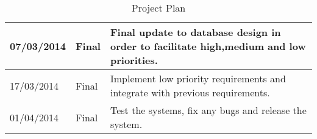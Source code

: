 \documentclass[a4paper,oneside,11pt]{report}
\begin{document}
\begin{center}
\begin{table}[!ht]
\begin{tabular}[ht]{| l | l | p{11cm} |}
    \hline
    07/03/2014 & Final & Final update to database design in order to facilitate high,medium and low		 		             priorities.\\
    \hline
    17/03/2014 & Final & Implement low priority requirements and integrate with previous requirements.\\
    \hline
    01/04/2014 & Final & Test the systems, fix any bugs and release the system.\\
    \hline
    \end{tabular}
    \caption{Project Plan}
\label{tab:test}
    \end{table}
    \end{center}

\printbibliography
\end{document}
